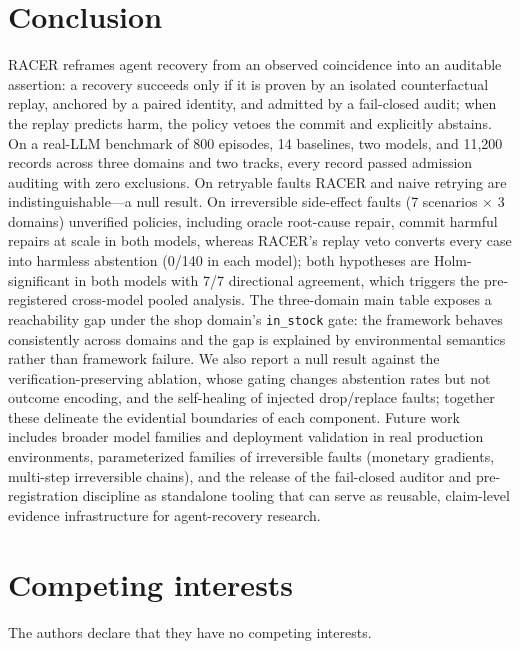 \documentclass[10pt]{article}
\begin{document}
\section{Conclusion}

RACER reframes agent recovery from an observed coincidence into an auditable assertion: a recovery succeeds only if it is proven by an isolated counterfactual replay, anchored by a paired identity, and admitted by a fail-closed audit; when the replay predicts harm, the policy vetoes the commit and explicitly abstains. On a real-LLM benchmark of 800 episodes, 14 baselines, two models, and 11,200 records across three domains and two tracks, every record passed admission auditing with zero exclusions. On retryable faults RACER and naive retrying are indistinguishable---a null result. On irreversible side-effect faults (7 scenarios $\times$ 3 domains) unverified policies, including oracle root-cause repair, commit harmful repairs at scale in both models, whereas RACER's replay veto converts every case into harmless abstention (0/140 in each model); both hypotheses are Holm-significant in both models with 7/7 directional agreement, which triggers the pre-registered cross-model pooled analysis. The three-domain main table exposes a reachability gap under the shop domain's \texttt{in\_stock} gate: the framework behaves consistently across domains and the gap is explained by environmental semantics rather than framework failure. We also report a null result against the verification-preserving ablation, whose gating changes abstention rates but not outcome encoding, and the self-healing of injected drop/replace faults; together these delineate the evidential boundaries of each component. Future work includes broader model families and deployment validation in real production environments, parameterized families of irreversible faults (monetary gradients, multi-step irreversible chains), and the release of the fail-closed auditor and pre-registration discipline as standalone tooling that can serve as reusable, claim-level evidence infrastructure for agent-recovery research.

\section*{Competing interests}
The authors declare that they have no competing interests.
\end{document}

